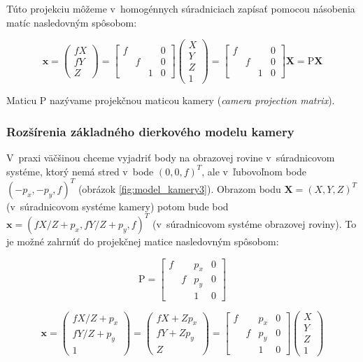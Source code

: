 Túto projekciu môžeme v~homogénnych súradniciach zapísať pomocou násobenia matíc nasledovným spôsobom:

$$ \mathbf{x} 
=
\begin{pmatrix}
fX \\
fY \\
Z
\end{pmatrix}
=
\begin{bmatrix}
f &   &   & 0 \\
  & f &   & 0 \\
  &   & 1 & 0
\end{bmatrix}
\begin{pmatrix}
X \\
Y \\
Z \\
1
\end{pmatrix}
=
\begin{bmatrix}
f &   &   & 0 \\
  & f &   & 0 \\
  &   & 1 & 0
\end{bmatrix}
\mathbf{X}
=
\mathrm{P} \mathbf{X}
$$

Maticu $\mathrm{P}$ nazývame projekčnou maticou kamery (\emph{camera projection matrix}).

\subsubsection{Rozšírenia základného dierkového modelu kamery}

V~praxi väčšinou chceme vyjadriť body na obrazovej rovine v~súradnicovom systéme, ktorý nemá stred v~bode $(0, 0, f)^T$, ale v~ľubovoľnom bode $(-p_x, -p_y, f)^T$ (obrázok \ref{fig:model_kamery3}). Obrazom bodu $\mathbf{X} = (X, Y, Z)^T$ (v~súradnicovom systéme kamery) potom bude bod $\mathbf{x} = (fX/Z + p_x, fY/Z + p_y, f)^T$ (v~súradnicovom systéme obrazovej roviny). To je možné zahrnúť do projekčnej matice nasledovným spôsobom:

$$ \mathrm{P} =
\begin{bmatrix}
f &   & p_x & 0 \\
  & f & p_y & 0 \\
  &   &  1  & 0
\end{bmatrix}
$$

$$ \mathbf{x} 
=
\begin{pmatrix}
fX/Z + p_x \\
fY/Z + p_y \\
1
\end{pmatrix}
=
\begin{pmatrix}
fX + Z p_x \\
fY + Z p_y \\
Z
\end{pmatrix}
=
\begin{bmatrix}
f &   &  p_x & 0 \\
  & f &  p_y & 0 \\
  &   &   1  & 0
\end{bmatrix}
\begin{pmatrix}
X \\
Y \\
Z \\
1
\end{pmatrix}
$$


